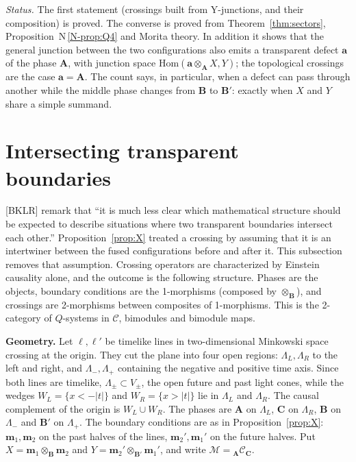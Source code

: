 \documentclass[11pt]{article}
\theoremstyle{definition}
\theoremstyle{remark}
\newcommand{\bfB}{\mathbf B}
\newcommand{\bfA}{\mathbf A}
\newcommand{\bfC}{\mathbf C}
\newcommand{\nref}[1]{N\,\ref{N-#1}}
\begin{document}
\emph{Status.} The first statement (crossings built from Y-junctions, and their composition) is proved. The converse is proved from Theorem~\ref{thm:sectors}, Proposition~\nref{prop:Q4} and Morita theory. In addition it shows that the general junction between the two configurations also emits a transparent defect $\mathbf a$ of the phase $\bfA$, with junction space $\mathrm{Hom}(\mathbf a\otimes_{\bfA}X,Y)$; the topological crossings are the case $\mathbf a=\bfA$. The count says, in particular, when a defect can pass through another while the middle phase changes from $\bfB$ to $\bfB'$: exactly when $X$ and $Y$ share a simple summand.

\section{Intersecting transparent boundaries}\label{sec:crossing}
[BKLR] remark that ``it is much less clear which mathematical structure should be expected to describe situations where two transparent boundaries intersect each other.'' Proposition~\ref{prop:X} treated a crossing by assuming that it is an intertwiner between the fused configurations before and after it. This subsection removes that assumption. Crossing operators are characterized by Einstein causality alone, and the outcome is the following structure. Phases are the objects, boundary conditions are the 1-morphisms (composed by $\otimes_{\bfB}$), and crossings are 2-morphisms between composites of 1-morphisms. This is the 2-category of $Q$-systems in $\mathcal C$, bimodules and bimodule maps.

\textbf{Geometry.} Let $\ell,\ell'$ be timelike lines in two-dimensional Minkowski space crossing at the origin. They cut the plane into four open regions: $\Lambda_L,\Lambda_R$ to the left and right, and $\Lambda_-,\Lambda_+$ containing the negative and positive time axis. Since both lines are timelike, $\Lambda_\pm\subset V_\pm$, the open future and past light cones, while the wedges $W_L=\{x<-|t|\}$ and $W_R=\{x>|t|\}$ lie in $\Lambda_L$ and $\Lambda_R$. The causal complement of the origin is $W_L\cup W_R$. The phases are $\bfA$ on $\Lambda_L$, $\bfC$ on $\Lambda_R$, $\bfB$ on $\Lambda_-$ and $\bfB'$ on $\Lambda_+$. The boundary conditions are as in Proposition~\ref{prop:X}: $\mathbf m_1,\mathbf m_2$ on the past halves of the lines, $\mathbf m_2',\mathbf m_1'$ on the future halves. Put $X=\mathbf m_1\otimes_{\bfB}\mathbf m_2$ and $Y=\mathbf m_2'\otimes_{\bfB'}\mathbf m_1'$, and write $\mathcal M={}_{\bfA}\mathcal C_{\bfC}$.
\end{document}
